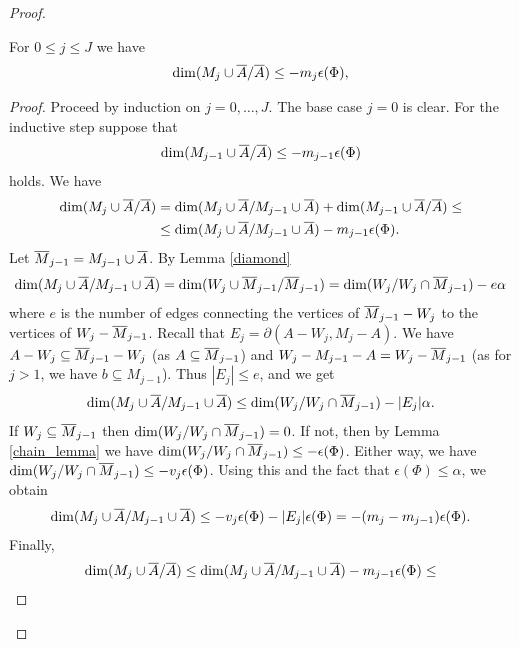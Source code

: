 \documentclass{amsart}
\begin{document}
\begin{proof}
  \begin{Lemma} \label{ubdim_lemma}
    For $0 \leq j \leq J$ we have
    \begin{align*}
      \dim(M_j \cup \overline{A} / \overline{A}) \leq -m_j  \epsilon(\Phi),
    \end{align*}
  \end{Lemma}
  \begin{proof}
    Proceed by induction on $j = 0, \ldots, J$. The base case $j = 0$ is clear.
    For the inductive step suppose that
    \begin{align*}
      \dim(M_{j-1} \cup \overline{A} / \overline{A}) \leq  - m_{j-1}  \epsilon(\Phi)
    \end{align*}
    holds.
    We have
    \begin{align*}
      \dim(M_j \cup \overline{A} / \overline{A}) &= \dim(M_j \cup \overline{A} / M_{j-1} \cup \overline{A}) + \dim(M_{j-1} \cup \overline{A} / \overline{A}) \leq \\
      &\leq \dim(M_j \cup \overline{A} / M_{j-1} \cup \overline{A}) - m_{j-1}  \epsilon(\Phi).
    \end{align*}
    Let ${\overline{M}}_{j-1} = M_{j-1} \cup \overline{A}$.
    By Lemma \ref{diamond}
    \begin{align*}
      \dim(M_j \cup \overline{A} / M_{j-1} \cup \overline{A}) = \dim(W_j \cup {\overline{M}}_{j-1} / {\overline{M}}_{j-1}) = \dim(W_j / W_j \cap {\overline{M}}_{j-1}) - e \alpha
    \end{align*}
    where $e$ is the number of edges connecting the vertices of ${\overline{M}}_{j-1} - W_j$ to the vertices of $W_j - {\overline{M}}_{j-1}$.
    Recall that       $E_j = \partial(A - W_j, M_j - A)$.
    We have $A - W_j \subseteq {\overline{M}}_{j-1} - W_j$ (as $A \subseteq {\overline{M}}_{j-1}$) and $W_j - M_{j-1} - A = W_j - {\overline{M}}_{j-1}$ (as for $j > 1$, we have $b \subseteq M_{j-1}$).
    Thus $|E_j| \leq e$, and we get 
    \begin{align*}
      \dim(M_j \cup \overline{A} / M_{j-1} \cup \overline{A}) \leq \dim(W_j / W_j \cap {\overline{M}}_{j-1}) - |E_j| \alpha.
    \end{align*}
    If $W_j \subseteq {\overline{M}}_{j-1}$ then $\dim(W_j / W_j \cap {\overline{M}}_{j-1}) = 0$.
    If not, then by Lemma \ref{chain_lemma} we have $\dim(W_j / W_j \cap {\overline{M}}_{j-1}) \leq - \epsilon(\Phi)$.
    Either way, we have $\dim(W_j / W_j \cap {\overline{M}}_{j-1}) \leq - v_j \epsilon(\Phi)$.
    Using this and the fact that $\epsilon(\Phi) \leq \alpha$, we obtain
    \begin{align*}
      \dim(M_j \cup \overline{A} / M_{j-1} \cup \overline{A}) \leq - v_j \epsilon(\Phi) - |E_j| \epsilon(\Phi) = -(m_j - m_{j-1})\epsilon(\Phi).
    \end{align*}
    Finally,
    \begin{align*}
      \dim(M_j \cup \BA / \BA) &\leq \dim(M_j \cup \BA / M_{j-1} \cup \BA) - m_{j-1}  \epsilon(\Phi) \leq \\

\end{align*}
\end{proof}
\end{proof}
\end{document}
